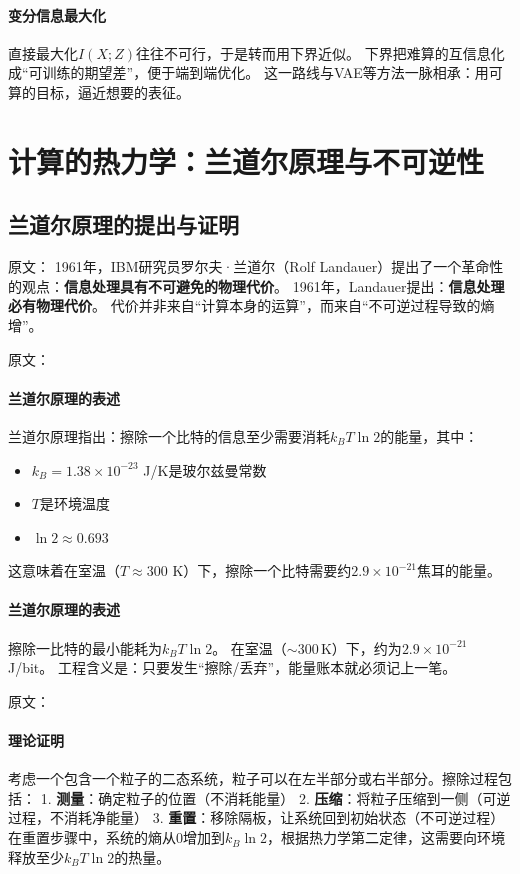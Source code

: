 \paragraph{变分信息最大化}
直接最大化$I(X;Z)$往往不可行，于是转而用下界近似。  
下界把难算的互信息化成“可训练的期望差”，便于端到端优化。  
这一路线与VAE等方法一脉相承：用可算的目标，逼近想要的表征。

\section{计算的热力学：兰道尔原理与不可逆性}

\subsection{兰道尔原理的提出与证明}

原文：
1961年，IBM研究员罗尔夫·兰道尔（Rolf Landauer）提出了一个革命性的观点：\textbf{信息处理具有不可避免的物理代价}。
1961年，Landauer提出：\textbf{信息处理必有物理代价}。  
代价并非来自“计算本身的运算”，而来自\;“不可逆过程导致的熵增”。

原文：
\paragraph{兰道尔原理的表述}
兰道尔原理指出：擦除一个比特的信息至少需要消耗$k_B T \ln 2$的能量，其中：
\begin{itemize}
\item $k_B = 1.38 \times 10^{-23}$ J/K是玻尔兹曼常数
\item $T$是环境温度
\item $\ln 2 \approx 0.693$
\end{itemize}
这意味着在室温（$T \approx 300$ K）下，擦除一个比特需要约$2.9 \times 10^{-21}$焦耳的能量。
\paragraph{兰道尔原理的表述}
擦除一比特的最小能耗为$k_BT\ln2$。  
在室温（$\sim300\,$K）下，约为$2.9\times10^{-21}$\,J/bit。  
工程含义是：\;只要发生“擦除/丢弃”，能量账本就必须记上一笔。

原文：
\paragraph{理论证明}
考虑一个包含一个粒子的二态系统，粒子可以在左半部分或右半部分。擦除过程包括：
1. \textbf{测量}：确定粒子的位置（不消耗能量）
2. \textbf{压缩}：将粒子压缩到一侧（可逆过程，不消耗净能量）
3. \textbf{重置}：移除隔板，让系统回到初始状态（不可逆过程）
在重置步骤中，系统的熵从0增加到$k_B \ln 2$，根据热力学第二定律，这需要向环境释放至少$k_B T \ln 2$的热量。
